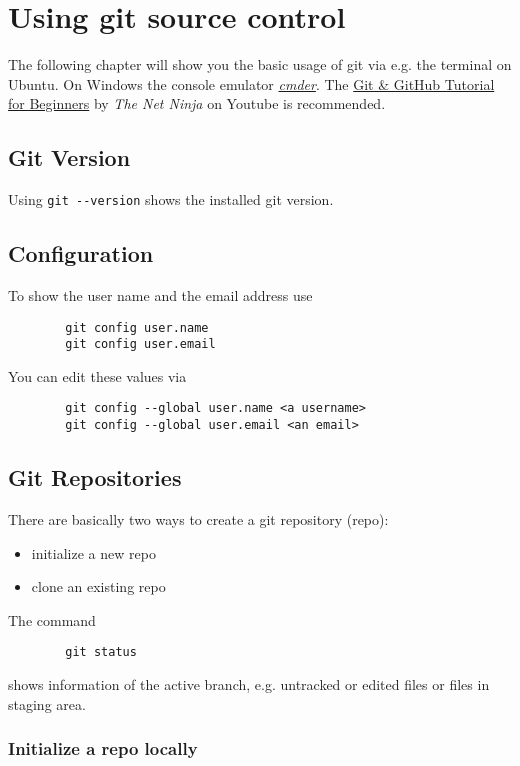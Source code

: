 \documentclass[12pt, twoside]{article}
\begin{document}
	\section{Using git source control}
	
	The following chapter will show you the basic usage of git via e.g. the terminal on Ubuntu. On Windows the console emulator \href{https://cmder.net/}{\textit{cmder}}. The \href{https://www.youtube.com/playlist?list=PL4cUxeGkcC9goXbgTDQ0n_4TBzOO0ocPR}{Git \& GitHub Tutorial for Beginners} by \textit{The Net Ninja} on Youtube is recommended.
	
	\subsection{Git Version}
	
	Using \verb|git --version| shows the installed git version.
	
	
	
	\subsection{Configuration}
	
	To show the user name and the email address use
	\begin{verbatim}
		git config user.name
		git config user.email
	\end{verbatim}
	You can edit these values via
	\begin{verbatim}
		git config --global user.name <a username>
		git config --global user.email <an email>
	\end{verbatim}
	
	
	\subsection{Git Repositories}
	
	There are basically two ways to create a git repository (repo):
	\begin{itemize}
		\item initialize a new repo
		\item clone an existing repo
	\end{itemize}

	The command 
	\begin{verbatim}
		git status
	\end{verbatim}
	shows information of the active branch, e.g. untracked or edited files or files in staging area.

	\subsubsection{Initialize a repo locally}
	
\end{document}
